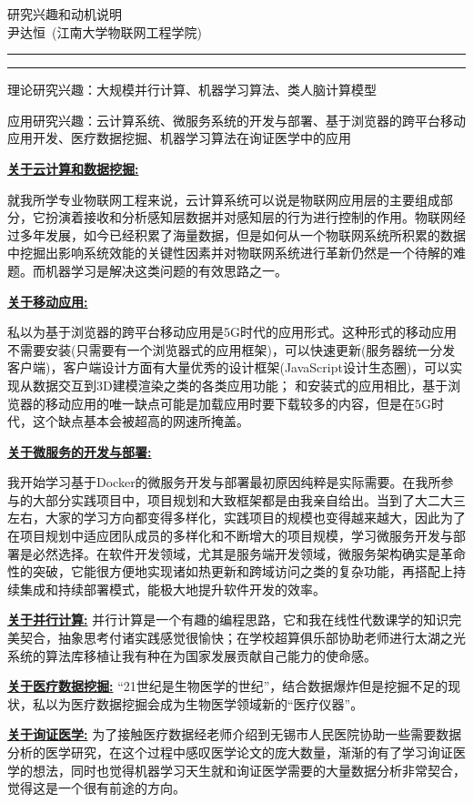 \documentclass[a4paper]{ctexart}
\newcommand{\soptitle}{研究兴趣和动机说明}
\newcommand{\yourname}{尹达恒}
\newcommand{\statement}[1]{\par\medskip
  \underline{\textbf{#1:}}\space
}
\begin{document}
\begin{center}\LARGE\soptitle\\
	\large\yourname\ (江南大学物联网工程学院)
\end{center}

\hrule
\vspace{1pt}
\hrule height 1pt

\bigskip

\renewcommand{\baselinestretch}{1.3}
理论研究兴趣：大规模并行计算、机器学习算法、类人脑计算模型

应用研究兴趣：云计算系统、微服务系统的开发与部署、基于浏览器的跨平台移动应用开发、医疗数据挖掘、机器学习算法在询证医学中的应用

\statement{关于云计算和数据挖掘}
就我所学专业物联网工程来说，云计算系统可以说是物联网应用层的主要组成部分，它扮演着接收和分析感知层数据并对感知层的行为进行控制的作用。物联网经过多年发展，如今已经积累了海量数据，但是如何从一个物联网系统所积累的数据中挖掘出影响系统效能的关键性因素并对物联网系统进行革新仍然是一个待解的难题。而机器学习是解决这类问题的有效思路之一。

\statement{关于移动应用}
私以为基于浏览器的跨平台移动应用是5G时代的应用形式。这种形式的移动应用不需要安装(只需要有一个浏览器式的应用框架)，可以快速更新(服务器统一分发客户端)，客户端设计方面有大量优秀的设计框架(JavaScript设计生态圈)，可以实现从数据交互到3D建模渲染之类的各类应用功能；
和安装式的应用相比，基于浏览器的移动应用的唯一缺点可能是加载应用时要下载较多的内容，但是在5G时代，这个缺点基本会被超高的网速所掩盖。


\statement{关于微服务的开发与部署}
我开始学习基于Docker的微服务开发与部署最初原因纯粹是实际需要。在我所参与的大部分实践项目中，项目规划和大致框架都是由我亲自给出。当到了大二大三左右，大家的学习方向都变得多样化，实践项目的规模也变得越来越大，因此为了在项目规划中适应团队成员的多样化和不断增大的项目规模，学习微服务开发与部署是必然选择。在软件开发领域，尤其是服务端开发领域，微服务架构确实是革命性的突破，它能很方便地实现诸如热更新和跨域访问之类的复杂功能，再搭配上持续集成和持续部署模式，能极大地提升软件开发的效率。

\statement{关于并行计算}并行计算是一个有趣的编程思路，它和我在线性代数课学的知识完美契合，抽象思考付诸实践感觉很愉快；在学校超算俱乐部协助老师进行太湖之光系统的算法库移植让我有种在为国家发展贡献自己能力的使命感。
\statement{关于医疗数据挖掘}“21世纪是生物医学的世纪”，结合数据爆炸但是挖掘不足的现状，私以为医疗数据挖掘会成为生物医学领域新的“医疗仪器”。
\statement{关于询证医学}为了接触医疗数据经老师介绍到无锡市人民医院协助一些需要数据分析的医学研究，在这个过程中感叹医学论文的庞大数量，渐渐的有了学习询证医学的想法，同时也觉得机器学习天生就和询证医学需要的大量数据分析非常契合，觉得这是一个很有前途的方向。
\pagestyle{empty}
\thispagestyle{empty}
\end{document}
